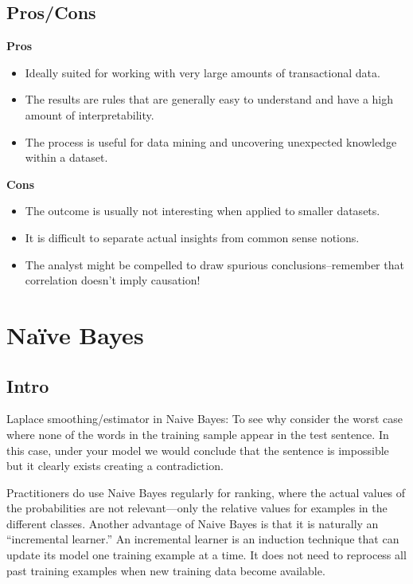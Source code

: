 \documentclass[]{book}
\begin{document}
\subsection{Pros/Cons}\label{proscons-9}

\textbf{Pros}

\begin{itemize}
\item
  Ideally suited for working with very large amounts of transactional
  data.
\item
  The results are rules that are generally easy to understand and have a
  high amount of interpretability.
\item
  The process is useful for data mining and uncovering unexpected
  knowledge within a dataset.
\end{itemize}

\textbf{Cons}

\begin{itemize}
\item
  The outcome is usually not interesting when applied to smaller
  datasets.
\item
  It is difficult to separate actual insights from common sense notions.
\item
  The analyst might be compelled to draw spurious conclusions--remember
  that correlation doesn't imply causation!
\end{itemize}

\section{Naïve Bayes}\label{naive-bayes}

\subsection{Intro}\label{intro-10}

Laplace smoothing/estimator in Naive Bayes: To see why consider the
worst case where none of the words in the training sample appear in the
test sentence. In this case, under your model we would conclude that the
sentence is impossible but it clearly exists creating a contradiction.

Practitioners do use Naive Bayes regularly for ranking, where the actual
values of the probabilities are not relevant---only the relative values
for examples in the different classes. Another advantage of Naive Bayes
is that it is naturally an ``incremental learner.'' An incremental
learner is an induction technique that can update its model one training
example at a time. It does not need to reprocess all past training
examples when new training data become available.
\end{document}
